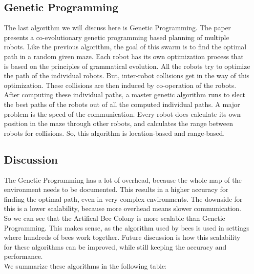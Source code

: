 \subsection{Genetic Programming}
The last algorithm we will discuss here is Genetic Programming. \cite{kala2012multi}
The paper presents a co-evolutionary genetic programming based planning of multiple robots. 
Like the previous algorithm, the goal of this swarm is to find the optimal path in a random given maze.
Each robot has its own optimization process that is based on the principles of grammatical evolution. 
All the robots try to optimize the path of the individual robots. 
But, inter-robot collisions get in the way of this optimization. 
These collisions are then induced by co-operation of the robots. 
After computing these individual paths, a master genetic algorithm runs to slect the best paths of the robots out of all the computed individual paths. 
A major problem is the speed of the communication.
Every robot does calculate its own position in the maze through other robots, and calculates the range between robots for collisions.
So, this algorithm is location-based and range-based. \\


\subsection{Discussion}
The Genetic Programming has a lot of overhead, because the whole map of the environment needs to be documented. 
This results in a higher accuracy for finding the optimal path, even in very complex environments. 
The downside for this is a lower scalability, because more overhead means slower communication.
So we can see that the Artifical Bee Colony is more scalable than Genetic Programming.
This makes sense, as the algorithm used by bees is used in settings where hundreds of bees work together. 
Future discussion is how this scalability for these algorithms can be improved, while still keeping the accuracy and performance. \\
    
We summarize these algorithms in the following table:

